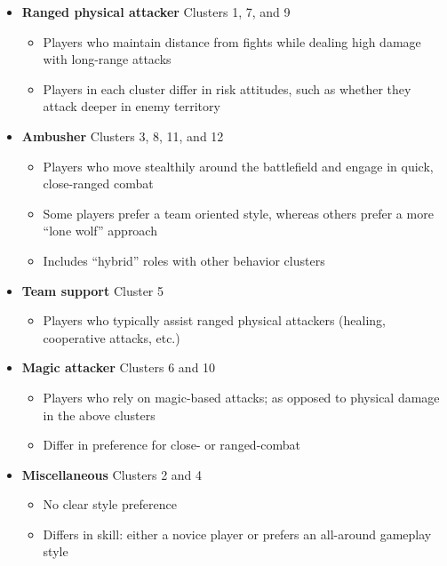 \documentclass[letterpaper,10 pt,conference]{ieeeconf}
\begin{document}
\begin{itemize}

  \item \textbf{Ranged physical attacker} Clusters 1, 7, and 9
  \begin{itemize}
    \item Players who maintain distance from fights while dealing high damage with long-range attacks
    \item Players in each cluster differ in risk attitudes, such as whether they attack deeper in enemy territory
  \end{itemize}

  \item \textbf{Ambusher} Clusters 3, 8, 11, and 12
  \begin{itemize}
    \item Players who move stealthily around the battlefield and engage in quick, close-ranged combat
    \item Some players prefer a team oriented style, whereas others prefer a more ``lone wolf'' approach
    \item Includes ``hybrid'' roles with other behavior clusters
  \end{itemize}

  \item \textbf{Team support} Cluster 5
  \begin{itemize}
    \item Players who typically assist ranged physical attackers (healing, cooperative attacks, etc.)
  \end{itemize}

  \item \textbf{Magic attacker} Clusters 6 and 10
  \begin{itemize}
    \item Players who rely on magic-based attacks; as opposed to physical damage in the above clusters
    \item Differ in preference for close- or ranged-combat
  \end{itemize}

  \item \textbf{Miscellaneous} Clusters 2 and 4
  \begin{itemize}
    \item No clear style preference
    \item Differs in skill: either a novice player or prefers an all-around gameplay style
  \end{itemize}

\end{itemize}
\end{document}
